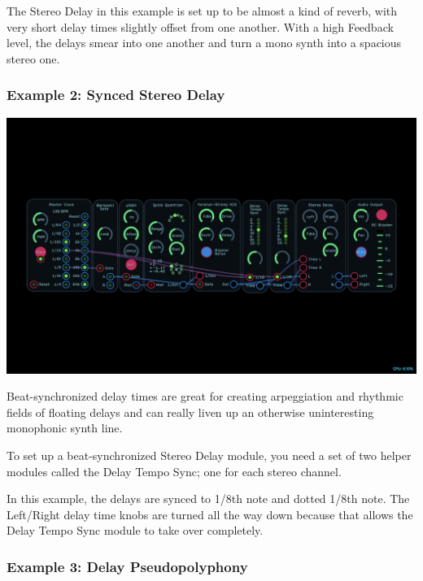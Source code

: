 \documentclass[11pt]{book}
\begin{document}
\begin{multicols*}{2}
The Stereo Delay in this example is set up to be almost a kind of reverb, with very short delay times slightly offset from one another. With a high Feedback level, the delays smear into one another and turn a mono synth into a spacious stereo one.

\subsubsection*{Example 2: Synced Stereo Delay}

\begin{center}
\includegraphics[width=0.95\linewidth]{stereo-delay-fig2.png}
\end{center}

Beat-synchronized delay times are great for creating arpeggiation and rhythmic fields of floating delays and can really liven up an otherwise uninteresting monophonic synth line.

To set up a beat-synchronized Stereo Delay module, you need a set of two helper modules called the Delay Tempo Sync; one for each stereo channel.

In this example, the delays are synced to 1/8th note and dotted 1/8th note. The Left/Right delay time knobs are turned all the way down because that allows the Delay Tempo Sync module to take over completely.

\subsubsection*{Example 3: Delay Pseudopolyphony}


\end{multicols*}
\end{document}
